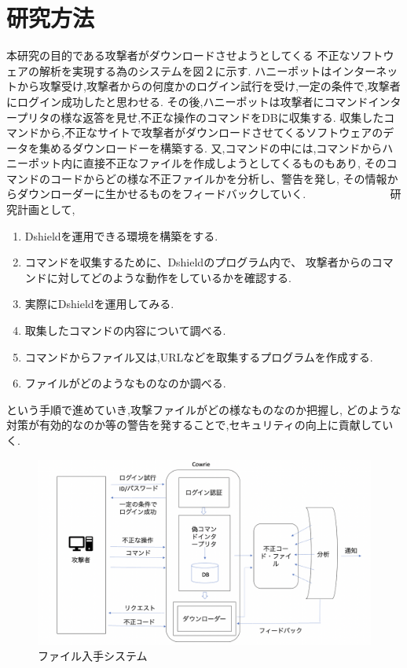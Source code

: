 \documentclass{entry}
\begin{document}
\section{研究方法}
本研究の目的である攻撃者がダウンロードさせようとしてくる
不正なソフトウェアの解析を実現する為のシステムを図２に示す.                   
ハニーポットはインターネットから攻撃受け,攻撃者からの何度かのログイン試行を受け,一定の条件で,攻撃者にログイン成功したと思わせる.
その後,ハニーポットは攻撃者にコマンドインタープリタの様な返答を見せ,不正な操作のコマンドをDBに収集する.
収集したコマンドから,不正なサイトで攻撃者がダウンロードさせてくるソフトウェアのデータを集めるダウンロードーを構築する.
又,コマンドの中には,コマンドからハニーポット内に直接不正なファイルを作成しようとしてくるものもあり,
そのコマンドのコードからどの様な不正ファイルかを分析し、警告を発し,
その情報からダウンローダーに生かせるものをフィードバックしていく.
　　　　　　　
研究計画として,
\begin{enumerate}
    \item Dshieldを運用できる環境を構築をする.
    \item コマンドを収集するために、Dshieldのプログラム内で、
	攻撃者からのコマンドに対してどのような動作をしているかを確認する.
    \item 実際にDshieldを運用してみる.
    \item 取集したコマンドの内容について調べる.
    \item コマンドからファイル又は,URLなどを取集するプログラムを作成する.
    \item ファイルがどのようなものなのか調べる.
\end{enumerate}
という手順で進めていき,攻撃ファイルがどの様なものなのか把握し,
どのような対策が有効的なのか等の警告を発することで,セキュリティの向上に貢献していく.
\begin{figure}[htbp]
	\centering
 	\includegraphics[width=\hsize]{hpsystem.png}
 	\caption{ファイル入手システム}
\end{figure}
\end{document}
